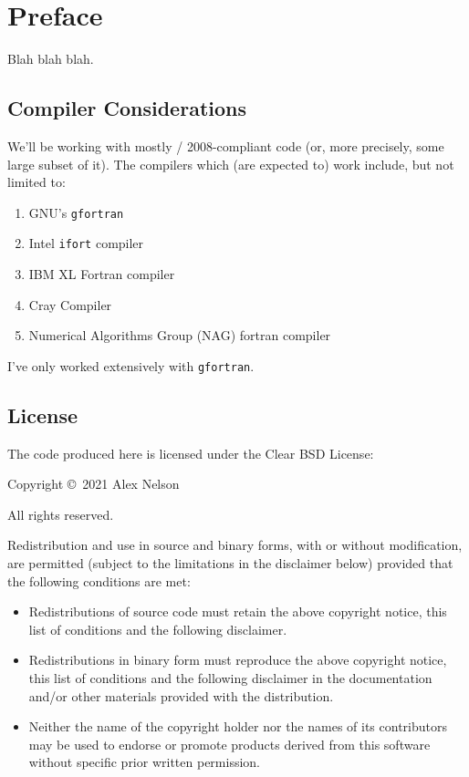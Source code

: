 \chapter{Preface}

Blah blah blah.

\section*{Compiler Considerations}

We'll be working with mostly \FORTRAN/ 2008-compliant code (or, more
precisely, some large subset of it). The compilers which (are expected
to) work include, but not limited to:
\begin{enumerate}
\item GNU's {\tt gfortran}
\item Intel {\tt ifort} compiler
\item IBM XL Fortran compiler
\item Cray Compiler
\item Numerical Algorithms Group (NAG) fortran compiler
\end{enumerate}
I've only worked extensively with {\tt gfortran}.

\section*{License}

The code produced here is licensed under the Clear BSD License:

\bigskip

Copyright \copyright\ 2021 Alex Nelson

All rights reserved.

Redistribution and use in source and binary forms, with or without
modification, are permitted (subject to the limitations in the
disclaimer below) provided that the following conditions are met:

\begin{itemize}
\item Redistributions of source code must retain the above copyright
     notice, this list of conditions and the following disclaimer.
\item Redistributions in binary form must reproduce the above copyright
     notice, this list of conditions and the following disclaimer in the
     documentation and/or other materials provided with the
     distribution.
\item Neither the name of the copyright holder nor the names of its
     contributors may be used to endorse or promote products derived
     from this software without specific prior written permission.
\end{itemize}

